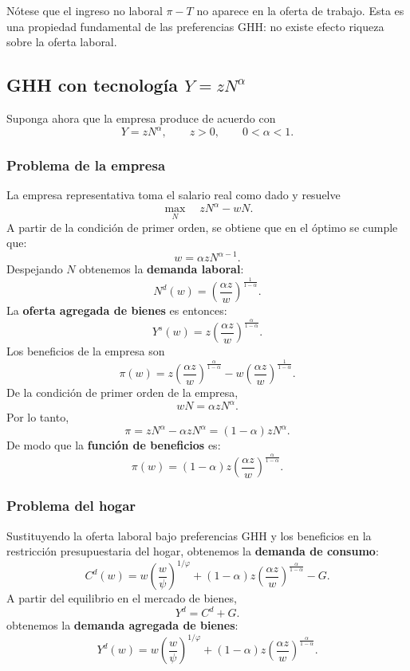 \documentclass[11pt]{article}
\begin{document}
Nótese que el ingreso no laboral $\pi-T$ no aparece en la oferta de trabajo. Esta es una propiedad fundamental de las preferencias GHH: no existe efecto riqueza sobre la oferta laboral.

\subsection{GHH con tecnología $Y=zN^\alpha$}

Suponga ahora que la empresa produce de acuerdo con
\[
Y=zN^\alpha,
\qquad
z>0,
\qquad
0<\alpha<1.
\]
\subsubsection*{Problema de la empresa}
La empresa representativa toma el salario real como dado y resuelve
\[
\max_N
\quad
zN^\alpha-wN.
\]
A partir de la condición de primer orden, se obtiene que en el óptimo se cumple que:
\[
w=\alpha zN^{\alpha-1}.
\]
Despejando $N$ obtenemos la \textbf{demanda laboral}:
\[
\boxed{
N^d(w)
=
\left(
\frac{\alpha z}{w}
\right)^{\frac{1}{1-\alpha}}
}.
\]
La \textbf{oferta agregada de bienes} es entonces:
\[
\boxed{
Y^s(w)
=
z
\left(
\frac{\alpha z}{w}
\right)^{\frac{\alpha}{1-\alpha}}
}.
\]
Los beneficios de la empresa son
\[
\pi(w)
=
z
\left(
\frac{\alpha z}{w}
\right)^{\frac{\alpha}{1-\alpha}}
-
w
\left(
\frac{\alpha z}{w}
\right)^{\frac{1}{1-\alpha}}.
\]
De la condición de primer orden de la empresa,
\[
wN=\alpha zN^\alpha.
\]
Por lo tanto,
\[
\pi
=
zN^\alpha-\alpha zN^\alpha
=
(1-\alpha)zN^\alpha.
\]
De modo que la \textbf{función de beneficios} es:
\[
\boxed{
\pi(w)
=
(1-\alpha)z
\left(
\frac{\alpha z}{w}
\right)^{\frac{\alpha}{1-\alpha}}
}.
\]

\subsubsection*{Problema del hogar}

Sustituyendo la oferta laboral bajo preferencias GHH y los beneficios en la restricción presupuestaria del hogar, obtenemos la \textbf{demanda de consumo}:
\[
\boxed{
C^d(w)
=
w
\left(\frac{w}{\psi}\right)^{1/\varphi}
+
(1-\alpha)z
\left(
\frac{\alpha z}{w}
\right)^{\frac{\alpha}{1-\alpha}}
-G
}.
\]
A partir del equilibrio en el mercado de bienes,
\[
Y^d=C^d+G.
\]
obtenemos la \textbf{demanda agregada de bienes}:
\[
\boxed{
Y^d(w)
=
w
\left(\frac{w}{\psi}\right)^{1/\varphi}
+
(1-\alpha)z
\left(
\frac{\alpha z}{w}
\right)^{\frac{\alpha}{1-\alpha}}
}.
\]
\end{document}
